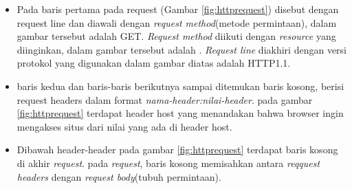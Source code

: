 \begin{itemize}
	\item Pada baris pertama pada request (Gambar \ref{fig:httprequest}) disebut dengan request line dan diawali dengan \textit{request method}(metode permintaan), dalam gambar tersebut adalah GET. \textit{Request method} diikuti dengan \textit{resource} yang diinginkan, dalam gambar tersebut adalah \/. \textit{Request line} diakhiri dengan versi protokol yang digunakan dalam gambar diatas adalah HTTP\/1.1.
	\item baris kedua dan baris-baris berikutnya sampai ditemukan baris kosong, berisi request headers dalam format \textit{nama-header:nilai-header}. pada gambar \ref{fig:httprequest} terdapat header host yang menandakan bahwa browser ingin mengakses situs dari nilai yang ada di header host.
	\item Dibawah header-header pada gambar \ref{fig:httprequest} terdapat baris kosong di akhir \textit{request}. pada \textit{request}, baris kosong memisahkan antara \textit{reqquest headers} dengan \textit{request body}(tubuh permintaan).
\end{itemize}


